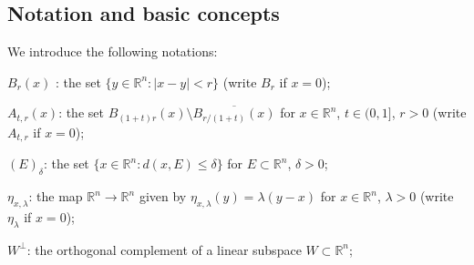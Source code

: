 \documentclass[11pt]{amsart}
\theoremstyle{definition}
\newcommand{\R}{\mathbb{R}}
\newcommand{\N}{\mathbb{N}}
\newcommand{\ssubset}{\subset\subset}
\DeclareMathOperator{\proj}{Proj}
\begin{document}
\subsection{Notation and basic concepts}
\label{notations}

We introduce the following notations:



$B_r(x)$
: the set $\{y\in \R^n:|x-y|<r\}$ (write $B_r$ if $x=0$);

$A_{t,r}(x)$: the set $B_{(1+t)r}(x)\setminus \overline{B_{r/(1+t)}(x)}$ for $x\in \R^n$, $t\in (0,1]$, $r>0$ (write $A_{t,r}$ if $x=0$);








$(E)_{\delta}$: the set $\{x\in \R^{n}: d(x, E)\le \delta\}$ for $E\subset \R^n$, $\delta>0$;

$\eta_{x,\lambda}$: the map $\R^n\to \R^n$ given by $\eta_{x,\lambda}(y)=\lambda(y-x)$ for $x\in \R^n$, $\lambda>0$ (write $\eta_\lambda$ if $x=0$);


$W^\perp$: the orthogonal complement of a linear subspace $W\subset \R^n$;


\end{document}
